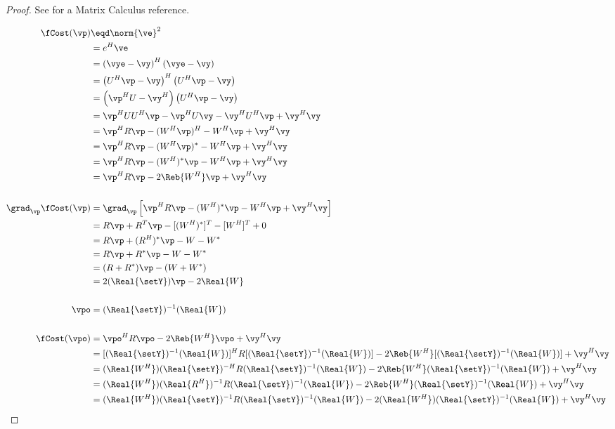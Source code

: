 \begin{proof}
See  for a Matrix Calculus reference.

\begin{align*}
   \fCost(\vp)
     &\eqd \norm{\ve}^2
   \\&=    e^H\ve
   \\&=    \left(\vye-\vy\right)^H\left(\vye-\vy\right)
   \\&=    \left(U^H\vp-\vy\right)^H\left(U^H\vp-\vy\right)
   \\&=    \left(\vp^HU-\vy^H\right)\left(U^H\vp-\vy\right)
   \\&=    \vp^HUU^H\vp - \vp^HU\vy -\vy^HU^H\vp + \vy^H\vy
   \\&=    \vp^H R \vp - (W^H\vp)^H -W^H\vp + \vy^H\vy
   \\&=    \vp^H R \vp - (W^H\vp)^\ast -W^H\vp + \vy^H\vy
   \\&=    \vp^H R \vp - (W^H)^\ast\vp -W^H\vp + \vy^H\vy
   \\&=    \vp^H R \vp - 2\Reb{W^H}\vp + \vy^H\vy
\\
\\
   \grad_\vp \fCost(\vp)
     &= \grad_\vp \left[ \vp^H R \vp - (W^H)^\ast\vp -W^H\vp + \vy^H\vy \right]
   \\&= R\vp + R^T\vp - [(W^H)^\ast]^T - [W^H]^T + 0
   \\&= R\vp + (R^H)^\ast\vp - W - W^\ast
   \\&= R\vp + R^\ast\vp - W - W^\ast
   \\&= (R + R^\ast)\vp - (W + W^\ast)
   \\&= 2(\Real{\setY})\vp - 2\Real{W}
\\
\\
   \vpo
     &= (\Real{\setY})^{-1}(\Real{W})
\\
\\
   \fCost(\vpo)
     &=    \vpo^H R \vpo - 2\Reb{W^H}\vpo + \vy^H\vy
   \\&=    [(\Real{\setY})^{-1}(\Real{W})]^H R [(\Real{\setY})^{-1}(\Real{W})] - 2\Reb{W^H}[(\Real{\setY})^{-1}(\Real{W})] + \vy^H\vy
   \\&=    (\Real{W^H})(\Real{\setY})^{-H} R (\Real{\setY})^{-1}(\Real{W})     - 2\Reb{W^H}(\Real{\setY})^{-1}(\Real{W})       + \vy^H\vy
   \\&=    (\Real{W^H})(\Real{R^H})^{-1} R (\Real{\setY})^{-1}(\Real{W})   - 2\Reb{W^H}(\Real{\setY})^{-1}(\Real{W})     + \vy^H\vy
   \\&=    (\Real{W^H})(\Real{\setY})^{-1} R (\Real{\setY})^{-1}(\Real{W})     - 2(\Real{W^H})(\Real{\setY})^{-1}(\Real{W})      + \vy^H\vy

\end{align*}
\end{proof}
